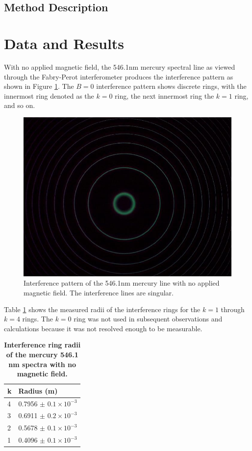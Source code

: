 \documentclass[twocolumn]{article}
\begin{document}
	\subsection{Method Description} \label{subsec:MethodDescription}
	
\section{Data and Results} \label{sec:DataAndResults}
	 
	 With no applied magnetic field, the 546.1nm mercury spectral line as viewed through the Fabry-Perot interferometer produces the interference pattern as shown in Figure \ref{fig:B=0Pattern}.
	 The $B=0$ interference pattern shows discrete rings, with the innermost ring denoted as the $k=0$ ring, the next innermost ring the $k=1$ ring, and so on.
	 
	 \begin{figure}
	 	\centering
	 	\includegraphics[width=0.65\linewidth]{Images/B=0Pattern}
	 	\caption{Interference pattern of the 546.1nm mercury line with no applied magnetic field. The interference lines are singular.}
	 	\label{fig:B=0Pattern}
	 \end{figure}
	 
	 Table \ref{tab:B0Data} shows the measured radii of the interference rings for the $k=1$ through $k=4$ rings.
	 The $k=0$ ring was not used in subsequent observations and calculations because it was not resolved enough to be measurable.
	 
	 \begin{table}[h]
	 	\centering
	 	\begin{tabular}{l|l}
	 		k & Radius (m) \\ \hline
	 		4 & 0.7956 $\pm$ $0.1\times10^{-3}$    \\
	 		3 & 0.6911 $\pm$ $0.2\times10^{-3}$    \\
	 		2 & 0.5678 $\pm$ $0.1\times10^{-3}$    \\
	 		1 & 0.4096 $\pm$ $0.1\times10^{-3}$   
	 	\end{tabular}
	 	\caption{\textbf{Interference ring radii of the mercury 546.1 nm spectra with no magnetic field.}}
	 	\label{tab:B0Data}
	 \end{table}
	 
\end{document}
